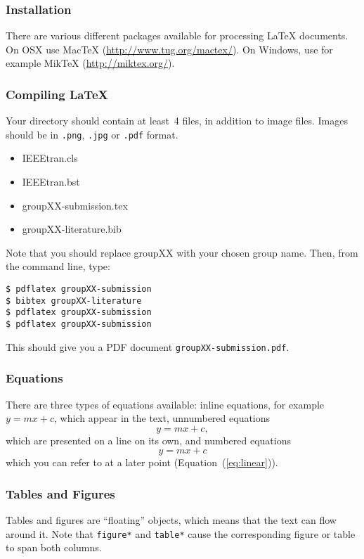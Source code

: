 \documentclass[10pt,conference,compsocconf]{IEEEtran}
\begin{document}
\subsubsection{Installation}

There are various different packages available for processing \LaTeX{}
documents.
On OSX use Mac\TeX{}
(\url{http://www.tug.org/mactex/}). On Windows, use for example Mik\TeX{} (\url{http://miktex.org/}).

\subsubsection{Compiling \LaTeX{}}
Your directory should contain at least~4 files, in addition to image
files. Images should be in \texttt{.png}, \texttt{.jpg} or
\texttt{.pdf} format.
\begin{itemize}
\item IEEEtran.cls
\item IEEEtran.bst
\item groupXX-submission.tex
\item groupXX-literature.bib
\end{itemize}
Note that you should replace groupXX with your chosen group name.
Then, from the command line, type:
\begin{verbatim}
$ pdflatex groupXX-submission
$ bibtex groupXX-literature
$ pdflatex groupXX-submission
$ pdflatex groupXX-submission
\end{verbatim}
This should give you a PDF document \texttt{groupXX-submission.pdf}.

\subsubsection{Equations}

There are three types of equations available: inline equations, for
example $y=mx + c$, which appear in the text, unnumbered equations
$$y=mx + c,$$
which are presented on a line on its own, and numbered equations
\begin{equation}
  \label{eq:linear}
  y = mx + c
\end{equation}
which you can refer to at a later point (Equation~(\ref{eq:linear})).

\subsubsection{Tables and Figures}

Tables and figures are ``floating'' objects, which means that the text
can flow around it.
Note
that \texttt{figure*} and \texttt{table*} cause the corresponding
figure or table to span both columns.
\end{document}
